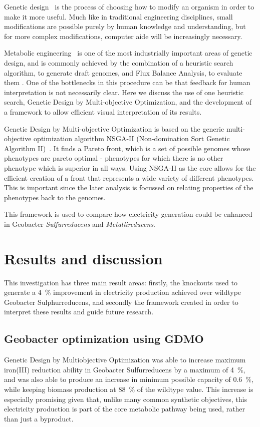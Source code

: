 \documentclass[a4paper,twocolumn]{article}
\begin{document}
Genetic design~\cite{} is the process of choosing how to modify an organism in order to make it more useful. Much like in traditional engineering disciplines, small modifications are possible purely by human knowledge and understanding, but for more complex modifications, computer aide will be increasingly necessary.

Metabolic engineering~\cite{} is one of the most industrially important areas of genetic design, and is commonly achieved by the combination of a heuristic search algorithm, to generate draft genomes, and Flux Balance Analysis, to evaluate them \cite{}. One of the bottlenecks in this procedure can be that feedback for human interpretation is not necessarily clear. Here we discuss the use of one heuristic search, Genetic Design by Multi-objective Optimization\cite{}, and the development of a framework to allow efficient visual interpretation of its results.

Genetic Design by Multi-objective Optimization is based on the generic multi-objective optimization algorithm NSGA-II (Non-domination Sort Genetic Algorithm II)~\cite{}. It finds a Pareto front, which is a set of possible genomes whose phenotypes are pareto optimal - phenotypes for which there is no other phenotype which is superior in all ways. Using NSGA-II as the core allows for the efficient creation of a front that represents a wide variety of different phenotypes. This is important since the later analysis is focussed on relating properties of the phenotypes back to the genomes.

This framework is used to compare how electricity generation could be enhanced in Geobacter \emph{Sulfurreducens} and \emph{Metallireducens}.

\section{Results and discussion}

This investigation has three main result areas: firstly, the knockouts used to generate a \SI{4}{\percent} improvement in electricity production achieved over wildtype Geobacter Sulphurreducens, and secondly the framework created in order to interpret these results and guide future research.

\subsection{Geobacter optimization using GDMO}
Genetic Design by Multiobjective Optimization was able to increase maximum iron(III) reduction ability in Geobacter Sulfurreducens by a maximum of  \SI{4}{\percent}, and was also able to produce an increase in minimum possible capacity of  \SI{0.6}{\percent}, while keeping biomass production at  \SI{88}{\percent} of the wildtype value. This increase is especially promising given that, unlike many common synthetic objectives, this electricity production is part of the core metabolic pathway being used, rather than just a byproduct. 
\end{document}
